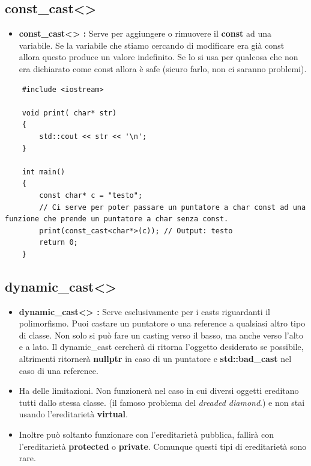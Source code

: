 \subsection{const\_cast<>}

\begin{itemize}
	\item \textsf{\small \textbf{const\_cast<> :} Serve per aggiungere o rimuovere il \textbf{const} ad una variabile. Se la variabile che stiamo cercando di modificare era già const allora questo produce un valore indefinito. Se lo si usa per qualcosa che non era dichiarato come const allora è safe (sicuro farlo, non ci saranno problemi). }
\end{itemize}

\begin{lstlisting}
	#include <iostream>
	
	void print( char* str)
	{
		std::cout << str << '\n';
	}

	int main()
	{
		const char* c = "testo";
		// Ci serve per poter passare un puntatore a char const ad una funzione che prende un puntatore a char senza const.
		print(const_cast<char*>(c)); // Output: testo
		return 0;
	}
\end{lstlisting}

\subsection{dynamic\_cast<>}

\begin{itemize}
	\item \textsf{\small \textbf{dynamic\_cast<> :} Serve esclusivamente per i casts riguardanti il polimorfismo. Puoi castare un puntatore o una reference a qualsiasi altro tipo di classe. Non solo si può fare un casting verso il basso, ma anche verso l'alto e a lato. Il dynamic\_cast cercherà di ritorna l'oggetto desiderato se possibile, altrimenti ritornerà \textbf{nullptr} in caso di un puntatore e \textbf{std::bad\_cast} nel caso di una reference.}
	\item \textsf{\small Ha delle limitazioni. Non funzionerà nel caso in cui diversi oggetti ereditano tutti dallo stessa classe. (il famoso problema del \emph{dreaded diamond}.) e non stai usando l'ereditarietà \textbf{virtual}.}
	\item \textsf{\small Inoltre può soltanto funzionare con l'ereditarietà pubblica, fallirà con l'ereditarietà \textbf{protected} o \textbf{private}. Comunque questi tipi di ereditarietà sono rare.}
\end{itemize}

